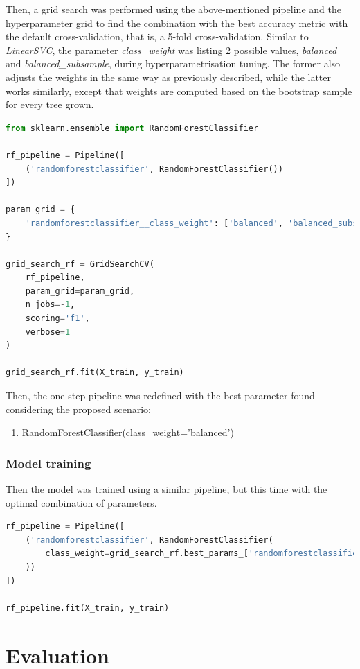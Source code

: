\documentclass{article}
\begin{document}
Then, a grid search was performed using the above-mentioned pipeline and the hyperparameter grid to find the combination with the best accuracy metric with the default cross-validation, that is, a 5-fold cross-validation. Similar to \emph{LinearSVC}, the parameter \emph{class\_weight} was listing 2 possible values, \emph{balanced} and \emph{balanced\_subsample}, during hyperparametrisation tuning. The former also adjusts the weights in the same way as previously described, while the latter works similarly, except that weights are computed based on the bootstrap sample for every tree grown.


\begin{lstlisting}[language=Python]
from sklearn.ensemble import RandomForestClassifier

rf_pipeline = Pipeline([
    ('randomforestclassifier', RandomForestClassifier())
])

param_grid = {
    'randomforestclassifier__class_weight': ['balanced', 'balanced_subsample']
}

grid_search_rf = GridSearchCV(
    rf_pipeline,
    param_grid=param_grid,
    n_jobs=-1,
    scoring='f1',
    verbose=1
)

grid_search_rf.fit(X_train, y_train)
\end{lstlisting}

Then, the one-step pipeline was redefined with the best parameter found considering the proposed scenario:
\begin{enumerate}    
    \item RandomForestClassifier(class\_weight='balanced')
\end{enumerate}

\subsubsection{Model training}
Then the model was trained using a similar pipeline, but this time with the optimal combination of parameters.

\begin{lstlisting}[language=Python]
rf_pipeline = Pipeline([
    ('randomforestclassifier', RandomForestClassifier(
        class_weight=grid_search_rf.best_params_['randomforestclassifier__class_weight']
    ))
])

rf_pipeline.fit(X_train, y_train)
\end{lstlisting}

\section{Evaluation}
\end{document}
